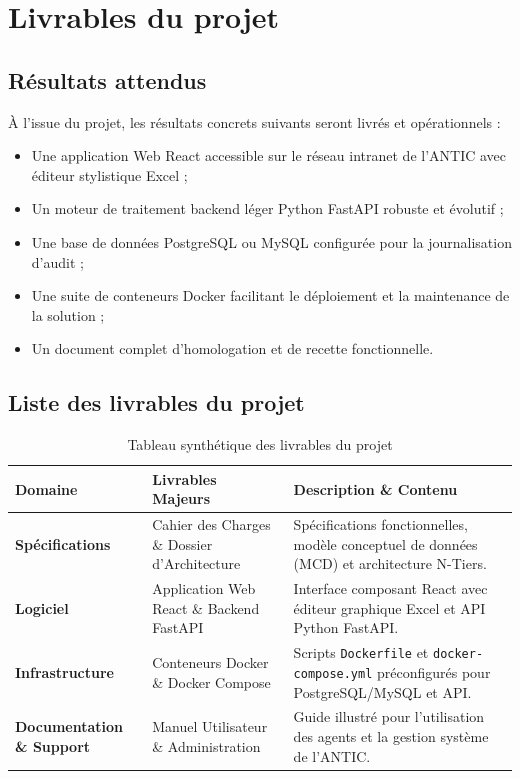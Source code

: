 \chapter{Livrables du projet}

\section{Résultats attendus}

À l'issue du projet, les résultats concrets suivants seront livrés et opérationnels :
\begin{itemize}
    \item Une application Web React accessible sur le réseau intranet de l'ANTIC avec éditeur stylistique Excel ;
    \item Un moteur de traitement backend léger Python FastAPI robuste et évolutif ;
    \item Une base de données PostgreSQL ou MySQL configurée pour la journalisation d'audit ;
    \item Une suite de conteneurs Docker facilitant le déploiement et la maintenance de la solution ;
    \item Un document complet d'homologation et de recette fonctionnelle.
\end{itemize}

\section{Liste des livrables du projet}

\renewcommand{\arraystretch}{1.3}
\begin{table}[H]
\centering
\small
\begin{tabular}{|L{3.2cm}|L{4.2cm}|L{6.1cm}|}
\hline
{}
\textbf{Domaine} & \textbf{Livrables Majeurs} & \textbf{Description \& Contenu} \\
\hline
\textbf{Spécifications} & Cahier des Charges \& Dossier d'Architecture & Spécifications fonctionnelles, modèle conceptuel de données (MCD) et architecture N-Tiers. \\
\hline
\textbf{Logiciel} & Application Web React \& Backend FastAPI & Interface composant React avec éditeur graphique Excel et API Python FastAPI. \\
\hline
\textbf{Infrastructure} & Conteneurs Docker \& Docker Compose & Scripts \texttt{Dockerfile} et \texttt{docker-compose.yml} préconfigurés pour PostgreSQL/MySQL et API. \\
\hline
\textbf{Documentation \& Support} & Manuel Utilisateur \& Administration & Guide illustré pour l'utilisation des agents et la gestion système de l'ANTIC. \\
\hline
\end{tabular}
\caption{Tableau synthétique des livrables du projet}
\label{tab:livrables_projet}
\end{table}
